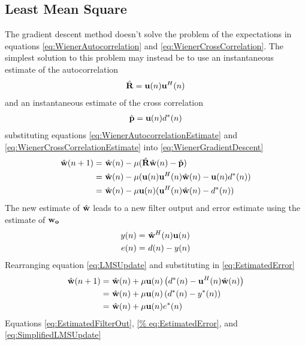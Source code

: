 \subsection{Least Mean Square}
\label{sec:LMS}
The gradient descent method doesn't solve the problem of %
the expectations in equations \ref{eq:WienerAutocorrelation} %
and \ref{eq:WienerCrossCorrelation}. The simplest solution %
to this problem may instead be to use an instantaneous %
estimate of the autocorrelation
\begin{align}
	\hat{\bold{R}} = \bold{u}(n)\bold{u}^{H}(n)
	\label{eq:WienerAutocorrelationEstimate}
\end{align}
and an instantaneous estimate of the cross correlation
\begin{align}
	\hat{\bold{p}} = \bold{u}(n)d^{*}(n)
	\label{eq:WienerCrossCorrelationEstimate}
\end{align}
substituting equations \ref{eq:WienerAutocorrelationEstimate} %
and \ref{eq:WienerCrossCorrelationEstimate} into %
\ref{eq:WienerGradientDescent}
\begin{align}
	\hat{\bold{w}}(n+1) =&~\hat{\bold{w}}(n)-\mu(
	\hat{\bold{R}}\hat{\bold{w}}(n) - \hat{
	\bold{p}})\\
	=&~\hat{\bold{w}}(n) - \mu(\bold{u}(n)
	\bold{u}^{H}(n)\hat{\bold{w}}(n) - 
	\bold{u}(n)d^{*}(n))\\
	=&~\hat{\bold{w}}(n) - \mu\bold{u}(n)(
	\bold{u}^{H}(n)\hat{\bold{w}}(n) - d^{*}
	(n))
	\label{eq:LMSUpdate}
\end{align}
The new estimate of $\hat{\bold{w}}$ leads %
to a new filter output and error estimate %
using the estimate of $\bold{w_{o}}$ 
\begin{align}
	y(n) =&~\hat{\bold{w}}^{H}(n)\bold{u}(n)
	\label{eq:EstimatedFilterOut}\\
	e(n) =&~d(n) - y(n)
	\label{eq:EstimatedError}
\end{align}
Rearranging equation \ref{eq:LMSUpdate} and substituting %
in \ref{eq:EstimatedError}
\begin{align}
	\hat{\bold{w}}(n+1) =&~\hat{\bold{w}}(n) + 
	\mu\bold{u}(n)\left(d^{*}(n) - \bold{u}^{H}
	(n)\hat{\bold{w}}(n)\right)\\
	=&~\hat{\bold{w}}(n) + \mu\bold{u}(n)\left(
	d^{*}(n) - y^{*}(n)\right)\\
	=&~\hat{\bold{w}}(n) + \mu\bold{u}(n)e^{*}(n)
	\label{eq:SimplifiedLMSUpdate}
\end{align}
Equations \ref{eq:EstimatedFilterOut}, \ref{%
eq:EstimatedError}, and \ref{eq:SimplifiedLMSUpdate} %
